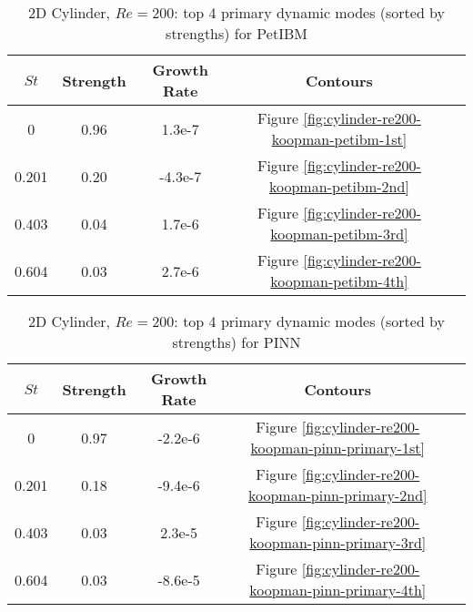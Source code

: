 \begin{table}[hbt!]
    \begin{threeparttable}[b]
        \begin{tabular}{ccccc}
            \toprule
            $St$ & Strength & Growth Rate & Contours \\
            \midrule
            0     & 0.96 & 1.3e-7  & Figure \ref{fig:cylinder-re200-koopman-petibm-1st}\\
            0.201 & 0.20 & -4.3e-7 & Figure \ref{fig:cylinder-re200-koopman-petibm-2nd}\\
            0.403 & 0.04 & 1.7e-6  & Figure \ref{fig:cylinder-re200-koopman-petibm-3rd}\\
            0.604 & 0.03 & 2.7e-6  & Figure \ref{fig:cylinder-re200-koopman-petibm-4th}\\
            \bottomrule
        \end{tabular}%
        \caption{%
            2D Cylinder, $Re=200$: top 4 primary dynamic modes (sorted by strengths) for PetIBM%
        }%
        \label{table:koopman-petibm}
    \end{threeparttable}
\end{table}%

\begin{table}[hbt!]
    \begin{threeparttable}[b]
        \begin{tabular}{ccccc}
            \toprule
            $St$ & Strength & Growth Rate & Contours \\
            \midrule
            0     & 0.97 & -2.2e-6  & Figure \ref{fig:cylinder-re200-koopman-pinn-primary-1st}\\
            0.201 & 0.18 & -9.4e-6  & Figure \ref{fig:cylinder-re200-koopman-pinn-primary-2nd}\\
            0.403 & 0.03 &  2.3e-5  & Figure \ref{fig:cylinder-re200-koopman-pinn-primary-3rd}\\
            0.604 & 0.03 & -8.6e-5  & Figure \ref{fig:cylinder-re200-koopman-pinn-primary-4th}\\
            \bottomrule
        \end{tabular}%
        \caption{%
            2D Cylinder, $Re=200$: top 4 primary dynamic modes (sorted by strengths) for PINN%
        }%
        \label{table:koopman-pinn-primary}
    \end{threeparttable}
\end{table}%

